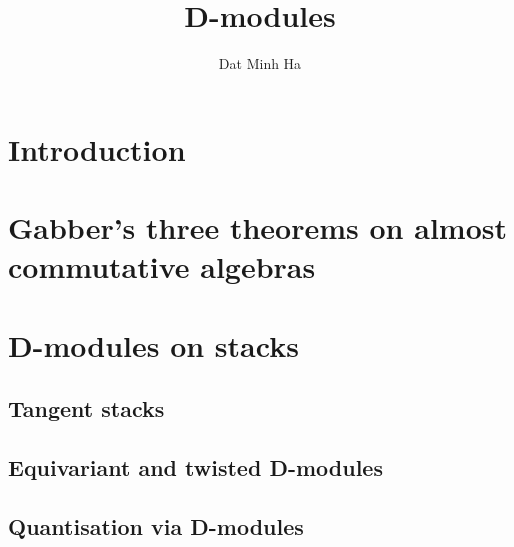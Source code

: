 

\setcounter{section}{-1}





    \title{D-modules}
    
    \author{Dat Minh Ha}
    \maketitle
    
    \begin{abstract}
        
    \end{abstract}
    
    {
      \hypersetup{}
      \tableofcontents %
    }

    \section{Introduction}

    \section{Gabber's three theorems on almost commutative algebras}

    \section{D-modules on stacks}
        \subsection{Tangent stacks}
    
        \subsection{Equivariant and twisted D-modules}
    
        \subsection{Quantisation via D-modules}
    
    \printbibliography

